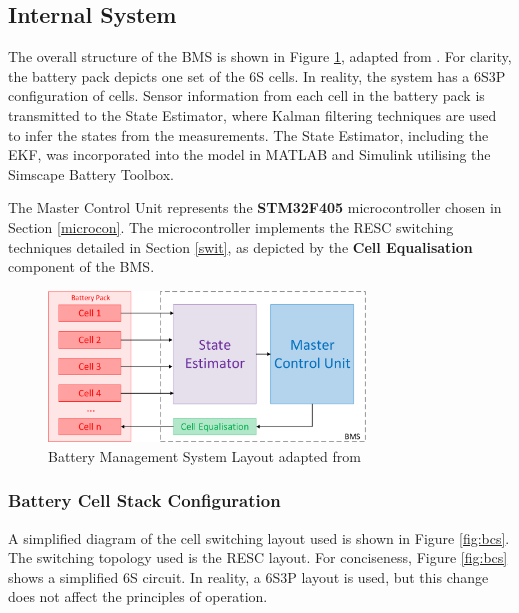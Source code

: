 \subsection{Internal System}

The overall structure of the \acrshort{BMS} is shown in Figure \ref{fig:bms_layout}, adapted from \cite{7555475}. For clarity, the battery pack depicts one set of the \acrshort{6S} cells. In reality, the system has a \acrshort{6S3P} configuration of cells. Sensor information from each cell in the battery pack is transmitted to the State Estimator, where Kalman filtering techniques are used to infer the states from the measurements. The State Estimator, including the \gls{EKF}, was incorporated into the model in MATLAB and Simulink utilising the Simscape Battery Toolbox.

The Master Control Unit represents the \textbf{STM32F405} microcontroller chosen in Section \ref{microcon}. The microcontroller implements the \gls{RESC} switching techniques detailed in Section \ref{swit}, as depicted by the \textbf{Cell Equalisation} component of the BMS.

\begin{figure}[H]
  \centering
  \vspace{5mm}
  \includegraphics[width=0.75\textwidth]{figs/Samuel/Figures/BMS Internal (1)-cropped.pdf}
  \caption[Battery Management System Layout]{Battery Management System Layout adapted from \cite{7555475}}
  \label{fig:bms_layout}
  \vspace{5mm}
\end{figure}






\subsubsection{Battery Cell Stack Configuration}

A simplified diagram of the cell switching layout used is shown in Figure \ref{fig:bcs}. The switching topology used is the \gls{RESC} layout. For conciseness, Figure \ref{fig:bcs} shows a simplified \gls{6S} circuit. In reality, a \gls{6S3P} layout is used, but this change does not affect the principles of operation. 

